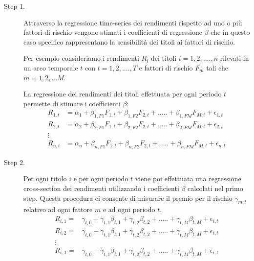\begin{description}
	\item[Step 1.] Attraverso la regressione time-series dei rendimenti rispetto ad uno o più fattori di rischio vengono stimati i coefficienti di regressione $\beta$ che in questo caso specifico rappresentano la sensibilità dei titoli ai fattori di rischio. 
	
	Per esempio consideriamo i rendimenti $R_{i}$ dei titoli $i=1,2,....,n$ rilevati in un arco temporale $t$ con $t= 1,2,....,T$ e fattori di rischio  $F_m$ tali che $m=1,2,...M$. 
	
	La regressione dei rendimenti dei titoli effettuata per ogni periodo $t$ permette di stimare i coefficienti $\beta$:
\begin{equation}
\begin{split}
	R_{1,t}&= \alpha_1 + \beta_{1,F1}F_{1,t}+\beta_{1,F2}F_{2,t}+.....+\beta_{1,FM}F_{M,t}+ \epsilon_{1,t}\\
		R_{2,t} &= \alpha_2 + \beta_{2,F1}F_{1,t}+\beta_{2,F2}F_{2,t}+.....+\beta_{2,FM}F_{M,t}+ \epsilon_{2,t}\\
		\vdots &  \\
			R_{n,t}&= \alpha_n + \beta_{n,F1}F_{1,t}+\beta_{n,F2}F_{2,t}+.....+\beta_{n,FM}F_{M,t}+ \epsilon_{n,t}
	\end{split}
\end{equation}
	\item [Step 2.] Per ogni titolo $i$ e per ogni periodo $t$ viene poi effettuata una regressione cross-section dei rendimenti utilizzando i coefficienti $\beta$ calcolati nel primo step. Questa procedura ci consente di misurare il premio per il rischio $\gamma_{m,t}$ relativo ad ogni fattore $m$ e ad ogni periodo $t$. 
	\begin{equation}
	\begin{split}
	R_{i,1}= & \gamma_{t,0}+\gamma_{t,1}\beta_{t,1}+\gamma_{t,2}\beta_{t,2}+.....+\gamma_{t,M}\beta_{t,M} + \epsilon_{i,t}\\
		R_{i,2}= & \gamma_{t,0}+\gamma_{t,1}\beta_{t,1}+\gamma_{t,2}\beta_{t,2}+.....+\gamma_{t,M}\beta_{t,M} + \epsilon_{i,t} \\
\vdots &  \\
R_{i,T} =& \gamma_{t,0}+\gamma_{t,1}\beta_{t,1}+\gamma_{t,2}\beta_{t,2}+.....+\gamma_{t,M}\beta_{t,M} + \epsilon_{i,t}
	\end{split}
	\end{equation}
\end{description}




